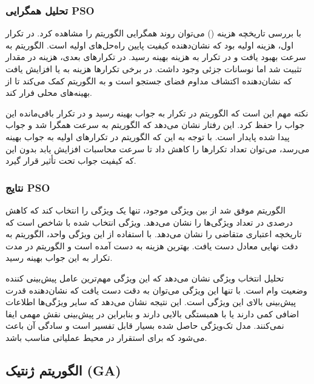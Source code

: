 \documentclass{article}
\begin{document}
\subsubsection{تحلیل همگرایی PSO}

با بررسی تاریخچه هزینه () می‌توان روند همگرایی الگوریتم را مشاهده کرد. در تکرار اول، هزینه اولیه  بود که نشان‌دهنده کیفیت پایین راه‌حل‌های اولیه است. الگوریتم به سرعت بهبود یافت و در تکرار  به هزینه بهینه  رسید. در تکرارهای بعدی، هزینه در مقدار  تثبیت شد اما نوسانات جزئی وجود داشت. در برخی تکرارها هزینه به  یا  افزایش یافت که نشان‌دهنده اکتشاف مداوم فضای جستجو است و به الگوریتم کمک می‌کند تا از بهینه‌های محلی فرار کند.

نکته مهم این است که الگوریتم در تکرار  به جواب بهینه رسید و در  تکرار باقی‌مانده این جواب را حفظ کرد. این رفتار نشان می‌دهد که الگوریتم به سرعت همگرا شد و جواب پیدا شده پایدار است. با توجه به این که الگوریتم در تکرارهای اولیه به جواب بهینه می‌رسد، می‌توان تعداد تکرارها را کاهش داد تا سرعت محاسبات افزایش یابد بدون این که کیفیت جواب تحت تأثیر قرار گیرد.

\subsubsection{نتایج PSO}

الگوریتم  موفق شد از بین  ویژگی موجود، تنها یک ویژگی را انتخاب کند که کاهش  درصدی در تعداد ویژگی‌ها را نشان می‌دهد. ویژگی انتخاب شده  با شاخص  است که تاریخچه اعتباری متقاضی را نشان می‌دهد. با استفاده از این ویژگی واحد، الگوریتم به دقت نهایی  معادل  دست یافت. بهترین هزینه به دست آمده  است و الگوریتم در مدت  تکرار به این جواب بهینه رسید.

تحلیل انتخاب ویژگی  نشان می‌دهد که این ویژگی مهم‌ترین عامل پیش‌بینی کننده وضعیت وام است. با تنها این ویژگی می‌توان به دقت  دست یافت که نشان‌دهنده قدرت پیش‌بینی بالای این ویژگی است. این نتیجه نشان می‌دهد که سایر ویژگی‌ها اطلاعات اضافی کمی دارند یا با  همبستگی بالایی دارند و بنابراین در پیش‌بینی نقش مهمی ایفا نمی‌کنند. مدل تک‌ویژگی حاصل شده بسیار قابل تفسیر است و سادگی آن باعث می‌شود که برای استقرار در محیط عملیاتی مناسب باشد.

\subsection{الگوریتم ژنتیک (GA)}
\end{document}
